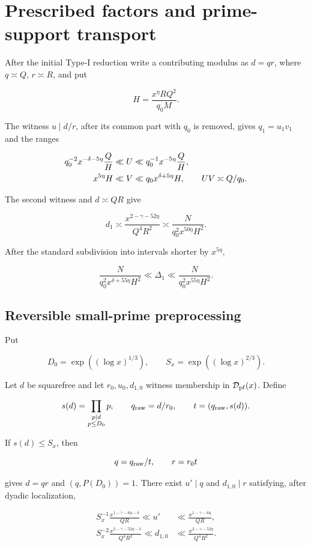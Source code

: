 \section{Prescribed factors and prime-support transport}
\label{sec:interfaces}

After the initial Type-I reduction write a contributing modulus as
$d=qr$, where $q\asymp Q$, $r\asymp R$, and put

\begin{equation}\label{eq:H}
 H=\frac{x^\eta RQ^2}{q_0M}.
\end{equation}

The witness $u\mid d/r$, after its common part with $q_0$ is removed,
gives $q_1=u_1v_1$ and the ranges

\begin{align}
 q_0^{-2}x^{-\delta-5\eta}\frac QH\ll U
 &\ll q_0^{-1}x^{-5\eta}\frac QH,\notag\\
 x^{5\eta}H\ll V&\ll q_0x^{\delta+5\eta}H,
 \qquad UV\asymp Q/q_0.
\label{eq:UV}
\end{align}

The second witness and $d\asymp QR$ give

\[
 d_1\asymp\frac{x^{2-\gamma-52\eta}}{Q^4R^2}
 \asymp\frac{N}{q_0^2x^{50\eta}H^2}.
\]

After the standard subdivision into intervals shorter by $x^{5\eta}$,

\begin{equation}\label{eq:Delta1}
 \frac{N}{q_0^2x^{\delta+55\eta}H^2}
 \ll\Delta_1\ll
 \frac{N}{q_0^2x^{55\eta}H^2}.
\end{equation}

\subsection{Reversible small-prime preprocessing}

Put

\[
 D_0=\exp((\log x)^{1/3}),\qquad
 S_x=\exp((\log x)^{2/3}).
\]

\begin{lemma}[Preprocessing]\label{lem:preprocessing}
Let $d$ be squarefree and let $r_0,u_0,d_{1,0}$ witness membership in
$\mathcal D_{\mathrm{pf}}(x)$.  Define

\[
 s(d)=\prod_{\substack{p\mid d\\p\le D_0}}p,\qquad
 q_{\rm raw}=d/r_0,\qquad t=(q_{\rm raw},s(d)).
\]

If $s(d)\le S_x$, then

\[
 q=q_{\rm raw}/t,\qquad r=r_0t
\]

gives $d=qr$ and $(q,P(D_0))=1$.  There exist $u'\mid q$ and
$d_{1,0}\mid r$ satisfying, after dyadic localization,

\begin{align}
 S_x^{-1}\frac{x^{1-\gamma-6\eta-\delta}}{QR}\ll u'
 &\ll\frac{x^{1-\gamma-6\eta}}{QR},\label{eq:pre-u}\\
 S_x^{-2}\frac{x^{2-\gamma-52\eta-\delta}}{Q^4R^2}\ll d_{1,0}
 &\ll\frac{x^{2-\gamma-52\eta}}{Q^4R^2}.
\label{eq:pre-d1}
\end{align}
\end{lemma}

